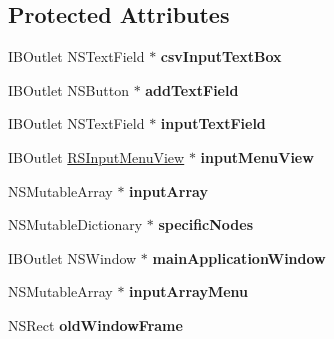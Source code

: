\subsection*{Protected Attributes}
\begin{DoxyCompactItemize}
\item 
\hypertarget{interface_app_controller_a1c51c7f576ca2a25f4f84e14f4468ee2}{
IBOutlet NSTextField $\ast$ {\bfseries csvInputTextBox}}
\label{interface_app_controller_a1c51c7f576ca2a25f4f84e14f4468ee2}

\item 
\hypertarget{interface_app_controller_a031cf3b6a7500084c7c857810640a329}{
IBOutlet NSButton $\ast$ {\bfseries addTextField}}
\label{interface_app_controller_a031cf3b6a7500084c7c857810640a329}

\item 
\hypertarget{interface_app_controller_ae0b04d653a2c1c1f7a8207aba7b12414}{
IBOutlet NSTextField $\ast$ {\bfseries inputTextField}}
\label{interface_app_controller_ae0b04d653a2c1c1f7a8207aba7b12414}

\item 
\hypertarget{interface_app_controller_a8211f4498910b78cb7f3e04e57e2c9cd}{
IBOutlet \hyperlink{interface_r_s_input_menu_view}{RSInputMenuView} $\ast$ {\bfseries inputMenuView}}
\label{interface_app_controller_a8211f4498910b78cb7f3e04e57e2c9cd}

\item 
\hypertarget{interface_app_controller_a521f6faa24c5c61873a3d973ed3120f1}{
NSMutableArray $\ast$ {\bfseries inputArray}}
\label{interface_app_controller_a521f6faa24c5c61873a3d973ed3120f1}

\item 
\hypertarget{interface_app_controller_ae12dbb07fbe7d40b313c759eea09fef5}{
NSMutableDictionary $\ast$ {\bfseries specificNodes}}
\label{interface_app_controller_ae12dbb07fbe7d40b313c759eea09fef5}

\item 
\hypertarget{interface_app_controller_a43be71400cde8fbead698b802e831c4e}{
IBOutlet NSWindow $\ast$ {\bfseries mainApplicationWindow}}
\label{interface_app_controller_a43be71400cde8fbead698b802e831c4e}

\item 
\hypertarget{interface_app_controller_aa874459146e24472356917e795871c89}{
NSMutableArray $\ast$ {\bfseries inputArrayMenu}}
\label{interface_app_controller_aa874459146e24472356917e795871c89}

\item 
\hypertarget{interface_app_controller_a81211ae2fbabeb0db36d8899dff2ede4}{
NSRect {\bfseries oldWindowFrame}}
\label{interface_app_controller_a81211ae2fbabeb0db36d8899dff2ede4}


\end{DoxyCompactItemize}
